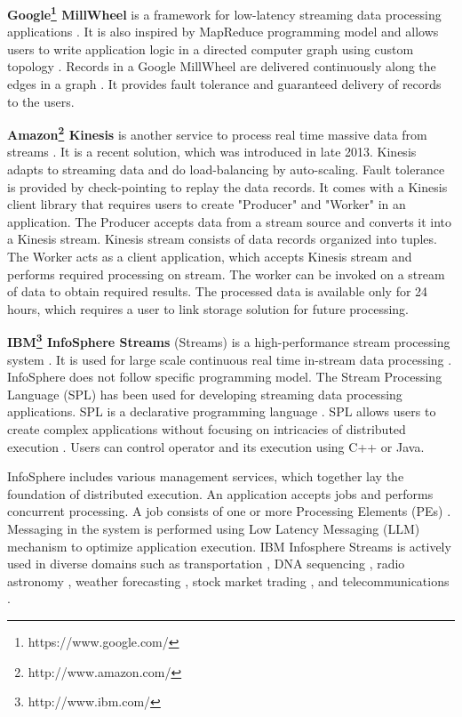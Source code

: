 \documentclass{acm_proc_article-sp}
\begin{document}
\textbf{Google\footnote{https://www.google.com/} MillWheel} is a framework for low-latency  streaming data processing applications \cite{41378}. It is also inspired by MapReduce programming model and allows users to write application logic in a directed computer graph using custom topology \cite{41378}. Records in a Google MillWheel are delivered continuously along the edges in a graph \cite{41378}. It provides fault tolerance and guaranteed delivery of records to the users. 
 
\textbf{Amazon\footnote{http://www.amazon.com/} Kinesis} is another service to process real time massive data from streams \cite{a2zKinesis}. It is a recent solution, which was introduced in late 2013. Kinesis adapts to streaming data and do load-balancing by auto-scaling. Fault tolerance is provided by check-pointing to replay the data records. It comes with a Kinesis client library that requires users to create "Producer" and "Worker" in an application. The Producer accepts data from a stream source and converts it into a Kinesis stream. Kinesis stream consists of data records organized into tuples. The Worker acts as a client application, which accepts Kinesis stream and performs required processing on stream. The worker can be invoked on a stream of data to obtain required results. The processed data is available only for 24 hours, which requires a user to link storage solution for future processing. 


\textbf{IBM\footnote{http://www.ibm.com/} InfoSphere Streams} (Streams) is a high-performance stream processing system \cite{ballard2010ibm}. It is used for large scale continuous real time in-stream data processing \cite{ballard2010ibm}. InfoSphere does not follow specific programming model. The Stream Processing Language (SPL) has been used for developing streaming data processing applications. SPL is a declarative programming language \cite{ballard2010ibm}. SPL allows users to create complex applications without focusing on intricacies of distributed execution \cite{ballard2010ibm}. Users can control operator and its execution using C++ or Java.  

InfoSphere includes various management services, which together lay the foundation of distributed execution.  An application accepts jobs and performs concurrent processing.  A job consists of one or more Processing Elements (PEs) \cite{ballard2010ibm}.  Messaging in the system is performed using Low Latency Messaging (LLM) mechanism to optimize application execution.  IBM Infosphere Streams is actively used in diverse domains such as transportation \cite{Biem:2010:IIS:1807167.1807291}, DNA sequencing \cite{Kienzler:2011:LDS:2238436.2238494}, radio astronomy \cite{5495521}, weather forecasting \cite{daldorff2009novel}, stock market trading \cite{4812538}, and  telecommunications \cite{IBM:Infosphere:App:Telecomm}. 
\end{document}

